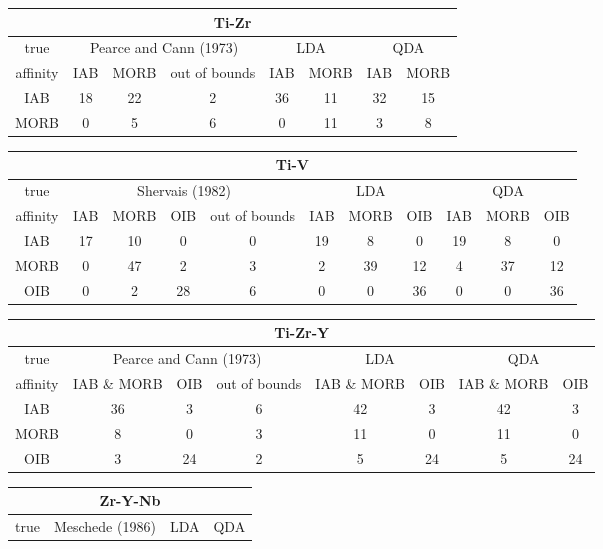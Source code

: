 \begin{table}[htbp]
  \centering
\begin{tabular}{c|ccc|cc|cc}
\hline
  \multicolumn{ 8}{c}{Ti-Zr}\\
\hline
true & \multicolumn{ 3}{c}{Pearce and Cann (1973)} & \multicolumn{ 2}{|c|}{LDA} & \multicolumn{ 2}{c}{QDA}\\
affinity &  IAB & MORB & out of bounds &  IAB & MORB &  IAB & MORB \\
\hline
 IAB & 18 & 22 &  2 & 36 & 11 & 32 & 15 \\
  MORB &  0 &  5 &  6 &  0 & 11 &  3 &  8 \\
\hline
\end{tabular}
\begin{tabular}{c|cccc|ccc|ccc}
\hline
\multicolumn{ 11}{c}{Ti-V} \\
\hline
true &    \multicolumn{ 4}{c}{Shervais (1982)} &  \multicolumn{ 3}{|c}{LDA} &  \multicolumn{ 3}{|c}{QDA} \\
affinity &  IAB & MORB &  OIB & out of bounds & IAB & MORB & OIB &  IAB & MORB &  OIB \\
\hline
 IAB & 17 & 10 &  0 &  0 & 19 &  8 &  0 & 19 &  8 &  0 \\
  MORB &  0 & 47 &  2 &  3 &  2 & 39 & 12 &  4 & 37 & 12 \\
  OIB &  0 &  2 & 28 &  6 &  0 &  0 & 36 &  0 &  0 & 36 \\
\hline
\end{tabular}
\begin{tabular}{c|ccc|cc|cc}
\hline
\multicolumn{ 8}{c}{Ti-Zr-Y} \\
\hline
true  & \multicolumn{ 3}{c}{Pearce and Cann (1973)} & \multicolumn{ 2}{|c|}{LDA} & \multicolumn{ 2}{c}{QDA} \\
affinity  & IAB \& MORB &  OIB & out of bounds & IAB \& MORB &  OIB & IAB \& MORB &  OIB \\
\hline
 IAB & 36 &  3 &  6 & 42 &  3 & 42 &  3 \\
  MORB &  8 &  0 &  3 & 11 &  0 & 11 &  0 \\
 OIB &  3 & 24 &  2 &  5 & 24 &  5 & 24 \\
\hline
\end{tabular}
\begin{tabular}{c|ccc|cc|cc}
\hline
\multicolumn{ 8}{c}{Zr-Y-Nb} \\
\hline
true  & \multicolumn{ 3}{c}{Meschede (1986)} & \multicolumn{ 2}{|c}{LDA} & \multicolumn{ 2}{|c}{QDA} \\

\end{tabular}
\end{table}
